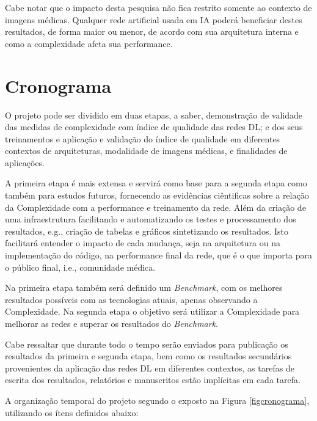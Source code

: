 \documentclass[
	12pt,				%
	openany,oneside,
	a4paper,			%
	english,			%
	brazil,				%
	]{abntex2}
\begin{document}
Cabe notar que o impacto desta pesquisa não fica restrito somente ao contexto de imagens médicas. Qualquer rede artificial usada em IA poderá beneficiar destes resultados, de forma maior ou menor, de acordo com sua arquitetura interna e como a complexidade afeta sua performance.

\chapter{Cronograma}
O projeto pode ser dividido em duas etapas, a saber, demonstração de validade das medidas de complexidade com índice de qualidade das redes DL; e dos seus treinamentos e aplicação e validação do índice de qualidade em diferentes contextos de arquiteturas, modalidade de imagens médicas, e finalidades de aplicações. 

A primeira etapa é mais extensa e servirá como base para a segunda etapa como também para estudos futuros, fornecendo as evidências ciêntificas sobre a relação da Complexidade com a performance e treinamento da rede. Além da criação de uma infraestrutura facilitando e automatizando os testes e processamento dos resultados, e.g., criação de tabelas e gráficos sintetizando os resultados. Isto facilitará entender o impacto de cada mudança, seja na arquitetura ou na implementação do código, na performance final da rede, que é o que importa para o público final, i.e., comunidade médica.
 
Na primeira etapa também será definido um \textit{Benchmark}, com os melhores resultados possíveis com as tecnologias atuais, apenas observando a Complexidade. Na segunda etapa o objetivo será utilizar a Complexidade para melhorar as redes e superar os resultados do \textit{Benchmark}.

Cabe ressaltar que durante todo o tempo serão enviados para publicação os resultados da primeira e segunda etapa, bem como os resultados secundários provenientes da aplicação das redes DL em diferentes contextos, as tarefas de escrita dos resultados, relatórios e manuscritos estão implícitas em cada tarefa.

A organização temporal do projeto segundo o exposto na Figura \ref{figcronograma}, utilizando os ítens definidos abaixo:
\end{document}
